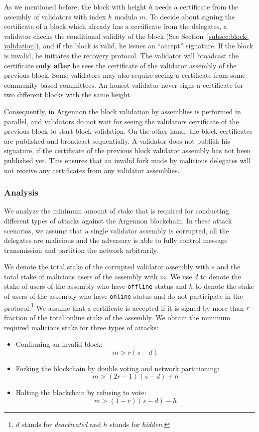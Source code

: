 As we mentioned before, the block with height $h$ needs a certificate from the assembly of
validators with index $h$ modulo $m$. To decide about signing the certificate of a block which already has
a certificate from the delegates, a validator checks the conditional
validity of the block (See Section~\ref{subsec:block-validation}), and if the block is valid, he issues
an ``accept'' signature. If the block is invalid, he initiates the recovery protocol. The validator will broadcast the
certificate \textbf{only after} he sees the certificate of the validator assembly of the previous block.
Some validators may also require seeing a certificate from
some community based committees. An honest validator never signs a certificate for two different blocks with the
same height.

Consequently, in Argennon the block validation by assemblies is performed in parallel, and validators
do not wait for seeing the validators certificate of the previous block to start block validation. On the
other hand, the block certificates are published and broadcast sequentially. A validator does not publish his
signature, if the certificate of the previous block validator assembly has not been published yet. This ensures that
an invalid fork made by malicious delegates will not receive any certificates from any validator assemblies.

\subsubsection{Analysis}

We analyze the minimum amount of stake that is required for conducting different types of attacks against the Argennon
blockchain. In these attack scenarios, we assume that a single validator assembly is corrupted, all the delegates
are malicious and the adversary is able to fully control message transmission and partition the network arbitrarily.

We denote the total stake of the corrupted validator assembly with $s$ and the total stake of malicious users of the
assembly with $m$. We use $d$ to denote the stake of users of the assembly who have \texttt{offline} status and $h$
to denote the stake of users of the assembly who have \texttt{online} status and do not participate in the
protocol.\footnote{$d$ stands for \emph{deactivated} and $h$ stands for \emph{hidden}.} We assume
that a certificate is accepted if it is signed by more than $r$ fraction of the total online stake of the assembly.
We obtain the minimum required malicious stake for three types of attacks:
\begin{itemize}
    \item Confirming an invalid block:
    \[ m > r(s-d) \]
    \item Forking the blockchain by double voting and network partitioning:
    \[m > (2r-1)(s-d)+h \]
    \item Halting the blockchain by refusing to vote:
    \[m > (1-r)(s-d)-h \]
\end{itemize}

